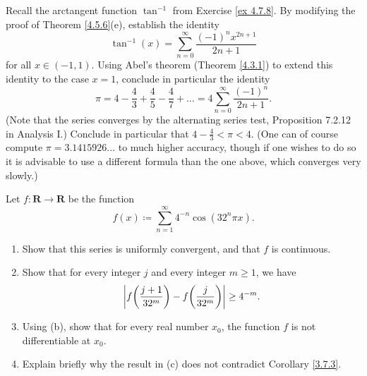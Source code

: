 \begin{exercise}\label{ex 4.7.9}
    Recall the arctangent function \(\tan^{-1}\) from Exercise \ref{ex 4.7.8}.
    By modifying the proof of Theorem \ref{4.5.6}(e), establish the identity
    \[
        \tan^{-1}(x) = \sum_{n = 0}^\infty \frac{(-1)^n x^{2n + 1}}{2n + 1}
    \]
    for all \(x \in (-1, 1)\).
    Using Abel's theorem (Theorem \ref{4.3.1}) to extend this identity to the case \(x = 1\), conclude in particular the identity
    \[
        \pi = 4 - \frac{4}{3} + \frac{4}{5} - \frac{4}{7} + \dots = 4 \sum_{n = 0}^\infty \frac{(-1)^n}{2n + 1}.
    \]
    (Note that the series converges by the alternating series test, Proposition 7.2.12 in Analysis I.)
    Conclude in particular that \(4 - \frac{4}{3} < \pi < 4\).
    (One can of course compute \(\pi = 3.1415926 \dots\) to much higher accuracy, though if one wishes to do so it is advisable to use a different formula than the one above, which converges very slowly.)
\end{exercise}

\begin{exercise}\label{ex 4.7.10}
    Let \(f : \mathbf{R} \to \mathbf{R}\) be the function
    \[
        f(x) \coloneqq \sum_{n = 1}^\infty 4^{-n} \cos(32^n \pi x).
    \]
    \begin{enumerate}
        \item Show that this series is uniformly convergent, and that \(f\) is continuous.
        \item Show that for every integer \(j\) and every integer \(m \geq 1\), we have
              \[
                  \abs*{f\bigg(\frac{j + 1}{32^m}\bigg) - f\bigg(\frac{j}{32^m}\bigg)} \geq 4^{-m}.
              \]
        \item Using (b), show that for every real number \(x_0\), the function \(f\) is not differentiable at \(x_0\).
        \item Explain briefly why the result in (c) does not contradict Corollary \ref{3.7.3}.
    \end{enumerate}
\end{exercise}